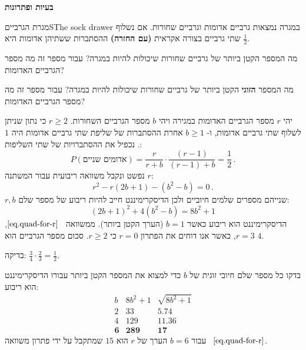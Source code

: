 


\begin{center}
\textbf{\Large בעיות ופתרונות}
\end{center}


\begin{prob}{מגרת הגרביים}{S}{The sock drawer}
במגרה נמצאות גרביים אדומות וגרביים שחורות. אם נשלוף שתי גרביים בצורה אקראית
\textbf{(עם החזרה)}
ההסתברות ששתיהן אדומות היא
$\frac{1}{2}$. 

מה המספר הקטן ביותר של גרביים שחורות שיכולות להיות במגרה? עבור מספר זה מה מספר הגרביים האדומות?

מה המספר 
\textbf{הזוגי}
הקטן ביותר של גרביים שחורות שיכולות להיות במגרה? עבור מספר זה מה מספר הגרביים האדומות?

\end{prob}


יהי
$r$
מספר הגרביים האדומות במגירה ויהי 
$b$
מספר הגרביים השחורות. 
$r\geq 2$
כי נתון שניתן לשלוף שתי גרביים אדומות, ו-%
$b\geq 1$
אחרת ההסתברות של שליפת שתי גרביים אדומות היה 
$1$.
נכפיל את ההסתברויות של שתי השליפות:
\begin{equation}\label{eq.1-a}
P(\textrm{אדומים שניים})=\frac{r}{r+b} \cdot \frac{(r-1)}{(r-1)+b} = \frac{1}{2}\,.
\end{equation}
נפשט ונקבל משוואה ריבועית עבור המשתנה 
$r$:
\begin{equation}\label{eq.quad-for-r}
r^2-r(2b+1)-(b^2-b)=0\,.
\end{equation}
$r,b$
שנייהם מספרים שלמים חיוביים ולכן הדיסקרימיננט חייב להיות ריבוע של מספר שלם:
\begin{equation}\label{eq.discriminant}
(2b+1)^2+4(b^2-b)=8b^2+1
\end{equation}
הדיסקרימיננט הוא ריבוע כאשר 
$b=1$
(הערך הקטן ביותר). ממשוואה%
~$\ref{eq.quad-for-r}$, $r=3$,
כאשר אנו דוחים את הפתרון 
$r=0$
כי
$r\geq 2$.
סכום מספר הגרביים הוא 
$4$.

בדיקה:
$\frac{3}{4}\cdot\frac{2}{3}=\frac{1}{2}$.

\medskip

בדקו כל מספר שלם חיובי זוגית של 
$b$
כדי למצוא את המספר הקטן ביותר עבורו הדיסקרימיננט הוא ריבוע:
\begin{displaymath}
\renewcommand{\arraystretch}{1}
\begin{array}{r|r|r}
b&8b^2+1&\sqrt{8b^2+1}\\
\hline
2&33&5.74\\
4&129&11.36\\
\mathbf{6}&\mathbf{289}&\mathbf{17}
\end{array}
\end{displaymath}
עבור
$b=6$ 
הערך של 
$r$
הוא
$15$
שמתקבל על ידי פתרון משוואה%
~$\ref{eq.quad-for-r}$.


